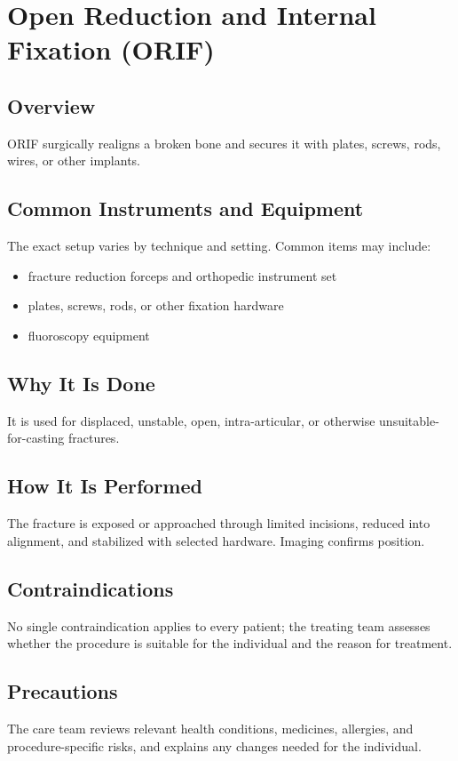 \chapter{Open Reduction and Internal Fixation (ORIF)}
\section*{Overview}
ORIF surgically realigns a broken bone and secures it with plates, screws, rods, wires, or other implants.
\section*{Common Instruments and Equipment}
The exact setup varies by technique and setting. Common items may include:
\begin{itemize}[nosep,leftmargin=*]
  \item fracture reduction forceps and orthopedic instrument set
  \item plates, screws, rods, or other fixation hardware
  \item fluoroscopy equipment
\end{itemize}

\section*{Why It Is Done}
It is used for displaced, unstable, open, intra-articular, or otherwise unsuitable-for-casting fractures.
\section*{How It Is Performed}
The fracture is exposed or approached through limited incisions, reduced into alignment, and stabilized with selected hardware. Imaging confirms position.
\section*{Contraindications}
No single contraindication applies to every patient; the treating team assesses whether the procedure is suitable for the individual and the reason for treatment.

\section*{Precautions}
The care team reviews relevant health conditions, medicines, allergies, and procedure-specific risks, and explains any changes needed for the individual.

